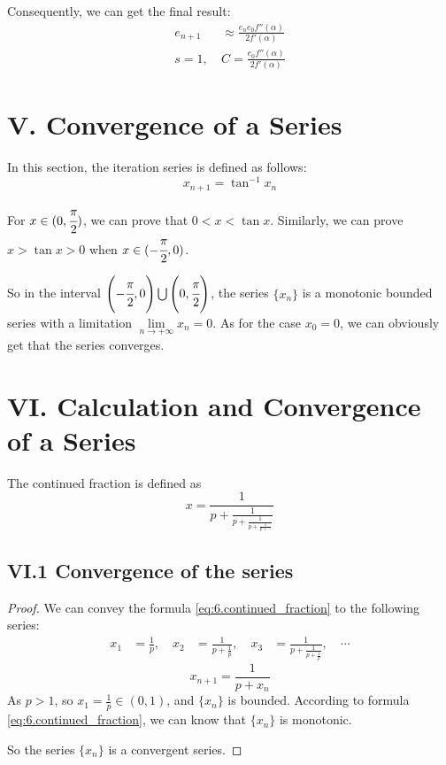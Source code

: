 \documentclass[a4paper]{article}
\begin{document}
Consequently, we can get the final result:
\begin{align}
    e_{n + 1} &\approx \frac{e_n e_0 f''(\alpha)}{2f'(\alpha)} \\
    s = 1,\ &C = \frac{e_0 f''(\alpha)}{2f'(\alpha)} 
    \label{eq:4.variation_final}
\end{align}

\section*{V. Convergence of a Series}
In this section, the iteration series is defined as follows:
\begin{equation}
    x_{n + 1} = \tan^{-1} x_n
    \label{eq:5.series}
\end{equation}

For $x \in (0, \cfrac{\pi}{2})$, we can prove that $0 < x < \tan x$. Similarly, we can prove $x > \tan x > 0$ when $x \in (-\cfrac{\pi}{2}, 0)$.

So in the interval $\left(-\cfrac{\pi}{2}, 0\right) \bigcup \left(0, \cfrac{\pi}{2}\right)$, the series $\{x_n\}$ is a monotonic bounded series with a limitation $\lim\limits_{n \to +\infty} x_n = 0$.
As for the case $x_0 = 0$, we can obviously get that the series converges.

\section*{VI. Calculation and Convergence of a Series}

The continued fraction is defined as
\begin{equation}
    x = \frac{1}{p + \frac{1}{p + \frac{1}{p + \frac{1}{p + \cdots}}}}
    \label{eq:6.continued_fraction}
\end{equation}

\subsection*{VI.1 Convergence of the series}

\begin{proof}
We can convey the formula \ref{eq:6.continued_fraction} to the following series:
\begin{equation}
    \begin{aligned}
        x_1 &= \frac{1}{p} ,\quad
        x_2 &= \frac{1}{p + \frac{1}{p}} ,\quad
        x_3 &= \frac{1}{p + \frac{1}{p + \frac{1}{p}}} ,\quad
        \cdots
    \end{aligned}
    \label{eq:6.series_1}
\end{equation}
\begin{equation}
    x_{n + 1} = \frac{1}{p + x_n}
    \label{eq:6.series_2}
\end{equation}
As $p > 1$, so $x_1 = \frac{1}{p} \in (0, 1)$, and $\{x_n\}$ is bounded. According to formula \ref{eq:6.continued_fraction}, we can know that $\{x_n\}$ is monotonic. 

So the series $\{x_n\}$ is a convergent series.
\end{proof}
\end{document}
